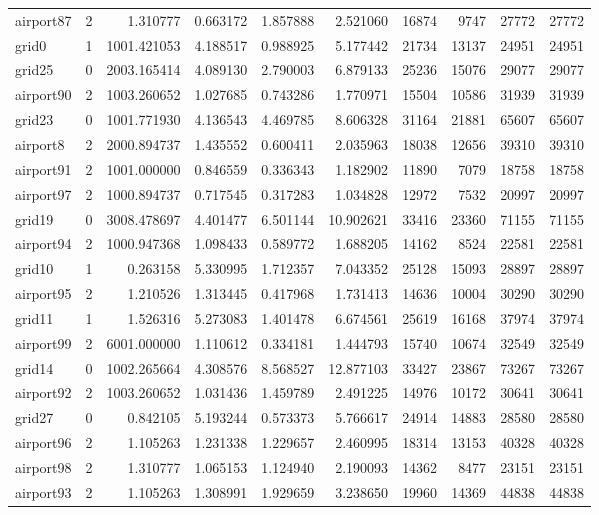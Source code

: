 \begin{longtable}{|l|r|r|r|r|r|r|r|r|r|}
airport87 & 2 & 1.310777 & 0.663172 & 1.857888 & 2.521060 & 16874 & 9747 & 27772 & 27772 \\
grid0 & 1 & 1001.421053 & 4.188517 & 0.988925 & 5.177442 & 21734 & 13137 & 24951 & 24951 \\
grid25 & 0 & 2003.165414 & 4.089130 & 2.790003 & 6.879133 & 25236 & 15076 & 29077 & 29077 \\
airport90 & 2 & 1003.260652 & 1.027685 & 0.743286 & 1.770971 & 15504 & 10586 & 31939 & 31939 \\
grid23 & 0 & 1001.771930 & 4.136543 & 4.469785 & 8.606328 & 31164 & 21881 & 65607 & 65607 \\
airport8 & 2 & 2000.894737 & 1.435552 & 0.600411 & 2.035963 & 18038 & 12656 & 39310 & 39310 \\
airport91 & 2 & 1001.000000 & 0.846559 & 0.336343 & 1.182902 & 11890 & 7079 & 18758 & 18758 \\
airport97 & 2 & 1000.894737 & 0.717545 & 0.317283 & 1.034828 & 12972 & 7532 & 20997 & 20997 \\
grid19 & 0 & 3008.478697 & 4.401477 & 6.501144 & 10.902621 & 33416 & 23360 & 71155 & 71155 \\
airport94 & 2 & 1000.947368 & 1.098433 & 0.589772 & 1.688205 & 14162 & 8524 & 22581 & 22581 \\
grid10 & 1 & 0.263158 & 5.330995 & 1.712357 & 7.043352 & 25128 & 15093 & 28897 & 28897 \\
airport95 & 2 & 1.210526 & 1.313445 & 0.417968 & 1.731413 & 14636 & 10004 & 30290 & 30290 \\
grid11 & 1 & 1.526316 & 5.273083 & 1.401478 & 6.674561 & 25619 & 16168 & 37974 & 37974 \\
airport99 & 2 & 6001.000000 & 1.110612 & 0.334181 & 1.444793 & 15740 & 10674 & 32549 & 32549 \\
grid14 & 0 & 1002.265664 & 4.308576 & 8.568527 & 12.877103 & 33427 & 23867 & 73267 & 73267 \\
airport92 & 2 & 1003.260652 & 1.031436 & 1.459789 & 2.491225 & 14976 & 10172 & 30641 & 30641 \\
grid27 & 0 & 0.842105 & 5.193244 & 0.573373 & 5.766617 & 24914 & 14883 & 28580 & 28580 \\
airport96 & 2 & 1.105263 & 1.231338 & 1.229657 & 2.460995 & 18314 & 13153 & 40328 & 40328 \\
airport98 & 2 & 1.310777 & 1.065153 & 1.124940 & 2.190093 & 14362 & 8477 & 23151 & 23151 \\
airport93 & 2 & 1.105263 & 1.308991 & 1.929659 & 3.238650 & 19960 & 14369 & 44838 & 44838 \\

\end{longtable}
